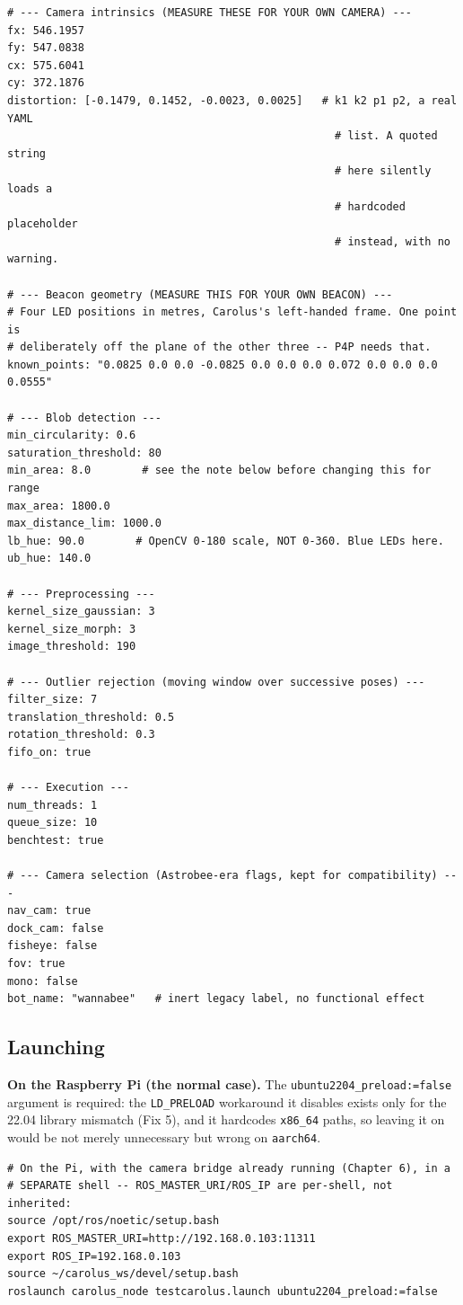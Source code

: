\documentclass[11pt]{report}
\begin{document}
\begin{lstlisting}[style=code]
# --- Camera intrinsics (MEASURE THESE FOR YOUR OWN CAMERA) ---
fx: 546.1957
fy: 547.0838
cx: 575.6041
cy: 372.1876
distortion: [-0.1479, 0.1452, -0.0023, 0.0025]   # k1 k2 p1 p2, a real YAML
                                                   # list. A quoted string
                                                   # here silently loads a
                                                   # hardcoded placeholder
                                                   # instead, with no warning.

# --- Beacon geometry (MEASURE THIS FOR YOUR OWN BEACON) ---
# Four LED positions in metres, Carolus's left-handed frame. One point is
# deliberately off the plane of the other three -- P4P needs that.
known_points: "0.0825 0.0 0.0 -0.0825 0.0 0.0 0.0 0.072 0.0 0.0 0.0 0.0555"

# --- Blob detection ---
min_circularity: 0.6
saturation_threshold: 80
min_area: 8.0        # see the note below before changing this for range
max_area: 1800.0
max_distance_lim: 1000.0
lb_hue: 90.0        # OpenCV 0-180 scale, NOT 0-360. Blue LEDs here.
ub_hue: 140.0

# --- Preprocessing ---
kernel_size_gaussian: 3
kernel_size_morph: 3
image_threshold: 190

# --- Outlier rejection (moving window over successive poses) ---
filter_size: 7
translation_threshold: 0.5
rotation_threshold: 0.3
fifo_on: true

# --- Execution ---
num_threads: 1
queue_size: 10
benchtest: true

# --- Camera selection (Astrobee-era flags, kept for compatibility) ---
nav_cam: true
dock_cam: false
fisheye: false
fov: true
mono: false
bot_name: "wannabee"   # inert legacy label, no functional effect
\end{lstlisting}

\subsection{Launching}

\textbf{On the Raspberry Pi (the normal case).} The
\texttt{ubuntu2204\_preload:=false} argument is required: the
\texttt{LD\_PRELOAD} workaround it disables exists only for the 22.04
library mismatch (Fix 5), and it hardcodes \texttt{x86\_64} paths, so
leaving it on would be not merely unnecessary but wrong on \texttt{aarch64}.

\begin{lstlisting}[style=shell]
# On the Pi, with the camera bridge already running (Chapter 6), in a
# SEPARATE shell -- ROS_MASTER_URI/ROS_IP are per-shell, not inherited:
source /opt/ros/noetic/setup.bash
export ROS_MASTER_URI=http://192.168.0.103:11311
export ROS_IP=192.168.0.103
source ~/carolus_ws/devel/setup.bash
roslaunch carolus_node testcarolus.launch ubuntu2204_preload:=false
\end{lstlisting}
\end{document}
